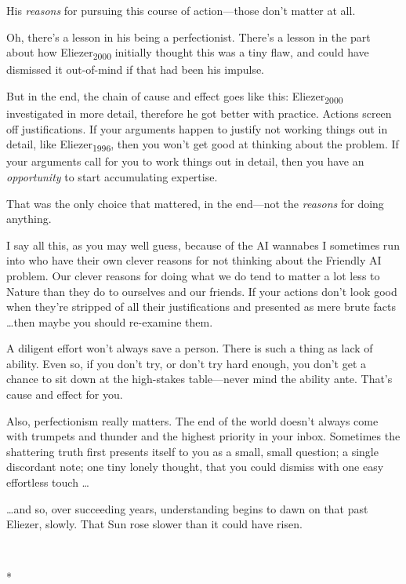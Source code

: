 {
 His \textit{reasons} for pursuing this course of action---those
don't matter at all.}

{
 Oh, there's a lesson in his being a perfectionist.
There's a lesson in the part about how
Eliezer\textsubscript{2000} initially thought this was a tiny flaw, and
could have dismissed it out-of-mind if that had been his impulse.}

{
 But in the end, the chain of cause and effect goes like this:
Eliezer\textsubscript{2000} investigated in more detail, therefore he
got better with practice. Actions screen off justifications. If your
arguments happen to justify not working things out in detail, like
Eliezer\textsubscript{1996}, then you won't get good at
thinking about the problem. If your arguments call for you to work
things out in detail, then you have an \textit{opportunity} to start
accumulating expertise.}

{
 That was the only choice that mattered, in the end---not the
\textit{reasons} for doing anything.}

{
 I say all this, as you may well guess, because of the AI wannabes
I sometimes run into who have their own clever reasons for not thinking
about the Friendly AI problem. Our clever reasons for doing what we do
tend to matter a lot less to Nature than they do to ourselves and our
friends. If your actions don't look good when
they're stripped of all their justifications and
presented as mere brute facts \ldots then maybe you should re-examine
them.}

{
 A diligent effort won't always save a person.
There is such a thing as lack of ability. Even so, if you
don't try, or don't try hard enough,
you don't get a chance to sit down at the high-stakes
table---never mind the ability ante. That's cause and
effect for you.}

{
 Also, perfectionism really matters. The end of the world
doesn't always come with trumpets and thunder and the
highest priority in your inbox. Sometimes the shattering truth first
presents itself to you as a small, small question; a single discordant
note; one tiny lonely thought, that you could dismiss with one easy
effortless touch \ldots}

{
 \ldots and so, over succeeding years, understanding begins to dawn
on that past Eliezer, slowly. That Sun rose slower than it could have
risen.}

{\centering
 \ ~
\par}

{\centering
 *
\par}

